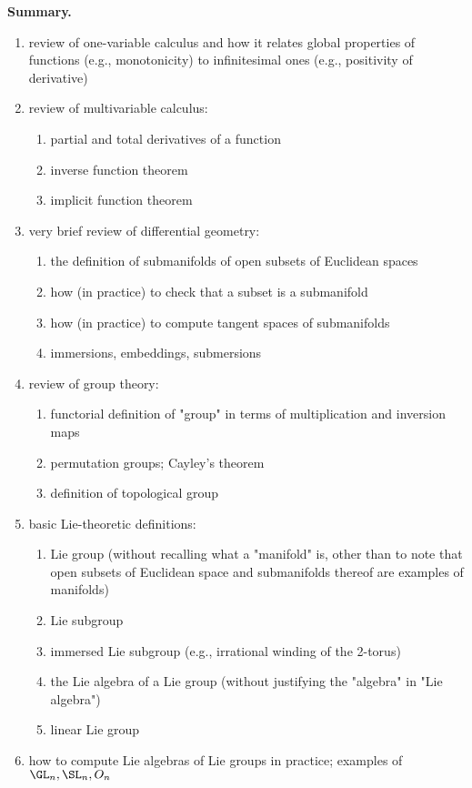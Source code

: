 \documentclass[reqno]{amsart} 
\begin{document}
\textbf{Summary.}
\begin{enumerate}
\item review of one-variable calculus and how it relates global properties of functions (e.g., monotonicity) to infinitesimal ones (e.g., positivity of derivative)
\item review of multivariable calculus:
  \begin{enumerate}
  \item partial and total derivatives of a function
  \item inverse function theorem
  \item implicit function theorem
  \end{enumerate}
\item very brief review of differential geometry:
  \begin{enumerate}
  \item the definition of submanifolds of open subsets of Euclidean spaces
  \item how (in practice) to check that a subset is a submanifold
  \item how (in practice) to compute tangent spaces of submanifolds
  \item immersions, embeddings, submersions
  \end{enumerate}
\item review of group theory:
  \begin{enumerate}
  \item functorial definition of "group" in terms of multiplication and inversion maps
  \item permutation groups; Cayley's theorem
  \item definition of topological group
  \end{enumerate}
\item basic Lie-theoretic definitions:
  \begin{enumerate}
  \item Lie group (without recalling what a "manifold" is, other than to note that open subsets of Euclidean space and submanifolds thereof are examples of manifolds)
  \item Lie subgroup
  \item immersed Lie subgroup (e.g., irrational winding of the 2-torus)
  \item the Lie algebra of a Lie group (without justifying the "algebra" in "Lie algebra")
  \item linear Lie group
  \end{enumerate}
\item how to compute Lie algebras of Lie groups in practice; examples of \(\GL_n, \SL_n, O_n\)
\end{enumerate}
\end{document}

